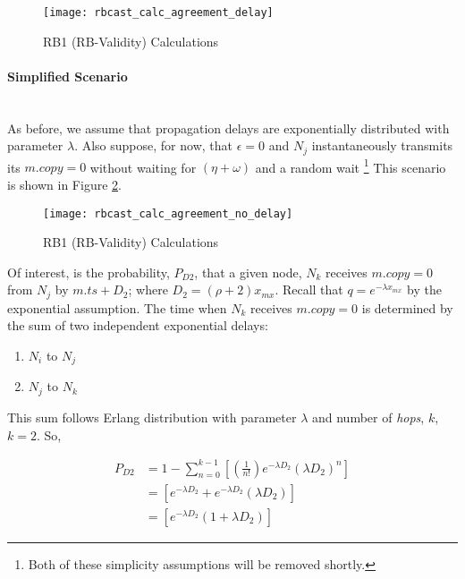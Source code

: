     \begin{figure}[H]
                \centering    
                \centerline{\texttt{[image: rbcast\_calc\_agreement\_delay]}}
                \caption[RB1 (RB-Validity) Calculations]{RB1 (RB-Validity) Calculations}
                 \label{fig:rbcast_a_delay}
        \end{figure} 
    
    \paragraph{Simplified Scenario} \hfill \\    
    As before, we assume that propagation delays are exponentially distributed with parameter $\lambda$.  Also suppose, for now, that $\epsilon = 0$ and $N_j$ instantaneously transmits its $m.copy = 0$ without waiting for $(\eta + \omega)$ and a random wait \footnote{Both of these simplicity assumptions will be removed shortly.}  This scenario is shown in Figure \ref{fig:rbcast_a_no_delay}.  
    
        \begin{figure}[h]
                \centering    
                \centerline{\texttt{[image: rbcast\_calc\_agreement\_no\_delay]}}
                \caption[RB1 (RB-Validity) Calculations]{RB1 (RB-Validity) Calculations}
                \label{fig:rbcast_a_no_delay}
        \end{figure} 
        
    Of interest, is the probability, $P_{D2}$, that a given node, $N_k$ receives $m.copy = 0$ from $N_j$ by $m.ts + D_2$; where $D_2 = (\rho + 2) x_{mx}$.  Recall that $q  = e^{-\lambda x_{mx}}$ by the exponential assumption.  The time when $N_k$ receives $m.copy = 0$ is determined by the sum of two independent exponential delays:
    \begin{enumerate}[label=\roman*]
        \item    $N_i$ to $N_j$
        \item    $N_j$ to $N_k$
    \end{enumerate}
    
    This sum follows Erlang distribution with parameter $\lambda$ and number of \emph{hops}, $k$, $k = 2$.  So,
    
    \begin{equation}
        \label{eq:pd_2_original}
        \begin{split}
                P_{D2} &= 1 - \sum\limits_{n=0}^{k-1}\left[ \left(\frac{1}{n!}\right) e^{-\lambda D_2} \left( \lambda D_2 \right)^n  \right] \\
                &=    \left[ e^{-\lambda D_2} + e^{-\lambda D_2}\left( \lambda D_2 \right)     \right] \\
                &=    \left[ e^{-\lambda D_2} \left( 1 + \lambda D_2 \right)    \right]
        \end{split}
    \end{equation}
        
